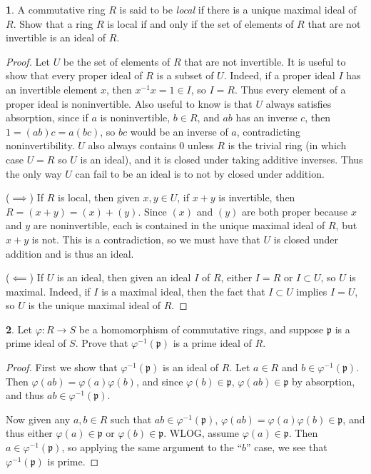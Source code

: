 \documentclass[12pt]{article}
\newcommand{\p}{\mathfrak{p}}
\theoremstyle{definition}
\newtheorem{ex}{}
\begin{document}
\begin{ex}
	A commutative ring $R$ is said to be \textit{local} if there is a unique maximal ideal of $R$.
	Show that a ring $R$ is local if and only if the set of elements of $R$ that are not invertible is an ideal of $R$.
\end{ex}
\begin{proof}
	Let $U$ be the set of elements of $R$ that are not invertible.
	It is useful to show that every proper ideal of $R$ is a subset of $U$.
	Indeed, if a proper ideal $I$ has an invertible element $x$, then $x^{-1}x = 1 \in I$, so $I = R$.
	Thus every element of a proper ideal is noninvertible.
	Also useful to know is that $U$ always satisfies absorption, since if $a$ is noninvertible, $b \in R$, and $ab$ has an inverse $c$, then $1 = (ab)c = a(bc)$, so $bc$ would be an inverse of $a$, contradicting noninvertibility.
	$U$ also always contains $0$ unless $R$ is the trivial ring (in which case $U = R$ so $U$ is an ideal), and it is closed under taking additive inverses.
	Thus the only way $U$ can fail to be an ideal is to not by closed under addition.

  ($\implies$) If $R$ is local, then given $x, y \in U$, if $x+y$ is invertible, then $R = (x+y) = (x) + (y)$.
  Since $(x)$ and $(y)$ are both proper because $x$ and $y$ are noninvertible, each is contained in the unique maximal ideal of $R$, but $x+y$ is not.
  This is a contradiction, so we must have that $U$ is closed under addition and is thus an ideal.

	($\impliedby$) If $U$ is an ideal, then given an ideal $I$ of $R$, either $I = R$ or $I \subset U$, so $U$ is maximal.
	Indeed, if $I$ is a maximal ideal, then the fact that $I \subset U$ implies $I = U$, so $U$ is the unique maximal ideal of $R$.
\end{proof}

\begin{ex}
	Let $\varphi: R \to S$ be a homomorphism of commutative rings, and suppose $\p$ is a prime ideal of $S$.
	Prove that $\varphi^{-1}(\p)$ is a prime ideal of $R$.
\end{ex}
\begin{proof}
	First we show that $\varphi^{-1}(\p)$ is an ideal of $R$.
	Let $a \in R$ and $b \in \varphi^{-1}(\p)$.
	Then $\varphi(ab) = \varphi(a)\varphi(b)$, and since $\varphi(b) \in \p$, $\varphi(ab) \in \p$ by absorption, and thus $ab \in \varphi^{-1}(\p)$.

	Now given any $a, b \in R$ such that $ab \in \varphi^{-1}(\p)$, $\varphi(ab) = \varphi(a)\varphi(b) \in \p$, and thus either $\varphi(a) \in \p$ or $\varphi(b) \in \p$.
	WLOG, assume $\varphi(a) \in \p$.
	Then $a \in \varphi^{-1}(\p)$, so applying the same argument to the ``$b$'' case, we see that $\varphi^{-1}(\p)$ is prime.
\end{proof}
\end{document}
